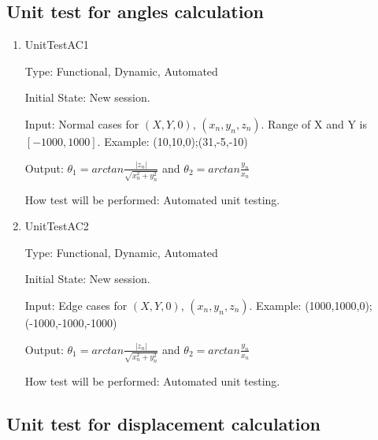 \documentclass[12pt, titlepage]{article}
\begin{document}
\subsection{Unit test for angles calculation}

\begin{enumerate}
	
	\item{UnitTestAC1\\}
	
	Type: Functional, Dynamic, Automated
	
	Initial State: New session.
	
	Input: Normal cases for $(X,Y,0)$, $(x_{n},y_{n},z_{n})$. Range of X and Y is $[-1000,1000]$. Example: (10,10,0);(31,-5,-10)
	
	Output: $\theta_{1}=arctan \frac{|z_{n}|}{\sqrt{x_{n}^2+y_{n}^2}}$ and $\theta_{2}=arctan \frac{y_{n}}{x_{n}}$
	
	How test will be performed: Automated unit testing.
	
	\item{UnitTestAC2\\}
	
	Type: Functional, Dynamic, Automated
	
	Initial State: New session.
	
	Input: Edge cases for $(X,Y,0)$, $(x_{n},y_{n},z_{n})$. Example: (1000,1000,0);(-1000,-1000,-1000)
	
	Output: $\theta_{1}=arctan \frac{|z_{n}|}{\sqrt{x_{n}^2+y_{n}^2}}$ and $\theta_{2}=arctan \frac{y_{n}}{x_{n}}$
	
	How test will be performed: Automated unit testing.
	
\end{enumerate}

\subsection{Unit test for displacement calculation}
\end{document}
